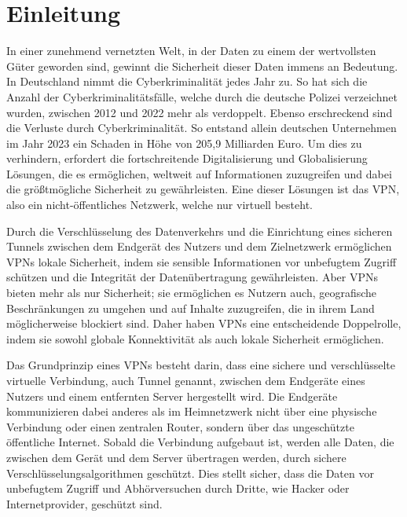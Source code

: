\chapter{Einleitung} \label{introduction}
In einer zunehmend vernetzten Welt, in der Daten zu einem der wertvollsten Güter geworden sind, gewinnt die Sicherheit dieser Daten immens an Bedeutung. In Deutschland nimmt die Cyberkriminalität jedes Jahr zu. So hat sich die Anzahl der Cyberkriminalitätsfälle, welche durch die deutsche Polizei verzeichnet wurden, zwischen 2012 und 2022 mehr als verdoppelt. \cite{Filed_cybercrime_cases_Germany_2022} Ebenso erschreckend sind die Verluste durch Cyberkriminalität. So entstand allein deutschen Unternehmen im Jahr 2023 ein Schaden in Höhe von 205,9 Milliarden Euro. \cite{Cybercrime_financial_loss_in_Germany_2023} Um dies zu verhindern, erfordert die fortschreitende Digitalisierung und Globalisierung Lösungen, die es ermöglichen, weltweit auf Informationen zuzugreifen und dabei die größtmögliche Sicherheit zu gewährleisten. Eine dieser Lösungen ist das \gls{VPN}, also ein nicht-öffentliches Netzwerk, welche nur virtuell besteht. 

Durch die Verschlüsselung des Datenverkehrs und die Einrichtung eines sicheren Tunnels zwischen dem Endgerät des Nutzers und dem Zielnetzwerk ermöglichen \gls{VPN}s lokale Sicherheit, indem sie sensible Informationen vor unbefugtem Zugriff schützen und die Integrität der Datenübertragung gewährleisten. Aber \gls{VPN}s bieten mehr als nur Sicherheit; sie ermöglichen es Nutzern auch, geografische Beschränkungen zu umgehen und auf Inhalte zuzugreifen, die in ihrem Land möglicherweise blockiert sind. Daher haben \gls{VPN}s eine entscheidende Doppelrolle, indem sie sowohl globale Konnektivität als auch lokale Sicherheit ermöglichen. \cite{Vergleich_der_besten_VPN-Protokolle_Nord_VPN}

Das Grundprinzip eines \gls{VPN}s besteht darin, dass eine sichere und verschlüsselte virtuelle Verbindung, auch Tunnel genannt, zwischen dem Endgeräte eines Nutzers und einem entfernten Server hergestellt wird. Die Endgeräte kommunizieren dabei anderes als im Heimnetzwerk nicht über eine physische Verbindung oder einen zentralen Router, sondern über das ungeschützte öffentliche Internet. Sobald die Verbindung aufgebaut ist, werden alle Daten, die zwischen dem Gerät und dem Server übertragen werden, durch sichere Verschlüsselungsalgorithmen geschützt. Dies stellt sicher, dass die Daten vor unbefugtem Zugriff und Abhörversuchen durch Dritte, wie Hacker oder Internetprovider, geschützt sind. \cite{Vergleich_der_besten_VPN-Protokolle_Nord_VPN, Wie_funktioniert_ein_Virtual_Private_Network_VPN}

